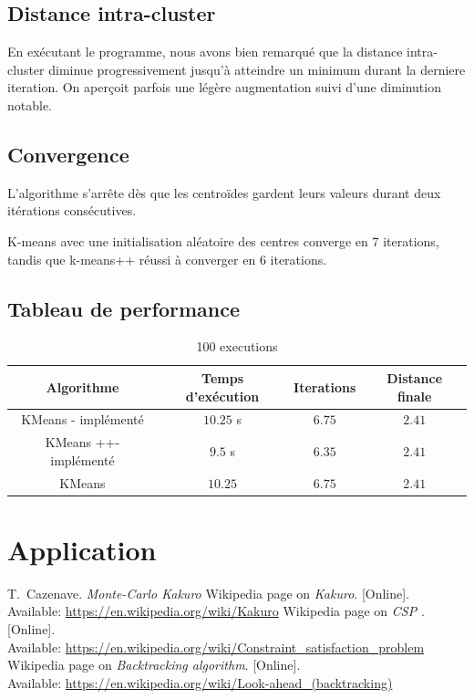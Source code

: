 \documentclass[french]{article}
\begin{document}
\subsection{Distance intra-cluster}
En exécutant le programme, nous avons bien remarqué que la distance intra-cluster diminue progressivement jusqu'à atteindre un minimum durant la derniere iteration. On aperçoit parfois une légère augmentation suivi d’une diminution notable.\\

\subsection{Convergence}
L’algorithme s'arrête dès que les centroïdes gardent leurs valeurs durant deux itérations consécutives.

K-means avec une initialisation aléatoire des centres converge en 7 iterations, tandis que k-means++ réussi à converger en 6 iterations.

\subsection{Tableau de performance}

    \begin{table}[!hbt]
        \begin{center}
        \caption{ 100 executions }
        \label{tab:simParameters}
        \begin{tabular}{|c|c|c|c|}
            \hline
           Algorithme & Temps d'exécution & Iterations  & Distance finale \\
            \hline
           KMeans - implémenté & $10.25$ s & $6.75$ & $2.41$ \\
            \hline
           KMeans ++- implémenté & $9.5$ s & $6.35$ & $2.41$  \\
            \hline      
           KMeans & $10.25$ & $6.75$ & $2.41$  \\
            \hline
        \end{tabular}
        \end{center}
    \end{table}

\section{Application}

\newpage
\begin{thebibliography}{5}
    T.~Cazenave. {\em Monte-Carlo Kakuro}
   Wikipedia page on {\em Kakuro}. [Online]. \\ Available:  \url{ https://en.wikipedia.org/wiki/Kakuro}
   Wikipedia page on {\em CSP }. [Online]. \\ Available:  \url{https://en.wikipedia.org/wiki/Constraint_satisfaction_problem}
   Wikipedia page on {\em Backtracking algorithm}. [Online]. \\ Available:  \url{https://en.wikipedia.org/wiki/Look-ahead_(backtracking)}
\end{thebibliography}
\end{document}

